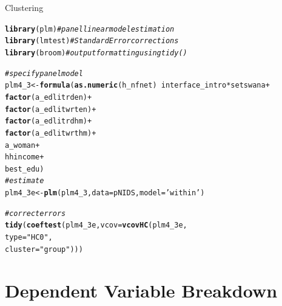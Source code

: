 \documentclass[a4paper,british]{article}\usepackage[]{graphicx}\usepackage[]{xcolor}
\makeatletter
\newcommand{\hlstr}[1]{\textcolor[rgb]{0.192,0.494,0.8}{#1}}%
\newcommand{\hlcom}[1]{\textcolor[rgb]{0.678,0.584,0.686}{\textit{#1}}}%
\newcommand{\hlopt}[1]{\textcolor[rgb]{0,0,0}{#1}}%
\newcommand{\hlstd}[1]{\textcolor[rgb]{0.345,0.345,0.345}{#1}}%
\newcommand{\hlkwb}[1]{\textcolor[rgb]{0.69,0.353,0.396}{#1}}%
\newcommand{\hlkwc}[1]{\textcolor[rgb]{0.333,0.667,0.333}{#1}}%
\newcommand{\hlkwd}[1]{\textcolor[rgb]{0.737,0.353,0.396}{\textbf{#1}}}%
\newenvironment{kframe}{%
 \def\at@end@of@kframe{}%
 \ifinner\ifhmode%
  \def\at@end@of@kframe{\end{minipage}}%
  \begin{minipage}{\columnwidth}%
 \fi\fi%
 \def\FrameCommand##1{\hskip\@totalleftmargin \hskip-\fboxsep
 \colorbox{shadecolor}{##1}\hskip-\fboxsep
     \hskip-\linewidth \hskip-\@totalleftmargin \hskip\columnwidth}%
 \MakeFramed {\advance\hsize-\width
   \@totalleftmargin\z@ \linewidth\hsize
   \@setminipage}}%
 {\par\unskip\endMakeFramed%
 \at@end@of@kframe}
\newenvironment{knitrout}{}{} %
\makeatother
\begin{document}
\begin{table}[H]
\caption{Clustering}

\begin{knitrout}
\color{fgcolor}\begin{kframe}
\begin{alltt}
\hlkwd{library}\hlstd{(plm)}    \hlcom{# panel linear model estimation}
\hlkwd{library}\hlstd{(lmtest)} \hlcom{# Standard Error corrections}
\hlkwd{library}\hlstd{(broom)}  \hlcom{# output formatting using tidy()}

\hlcom{# specify panel model}
\hlstd{plm4_3} \hlkwb{<-} \hlkwd{formula}\hlstd{(}\hlkwd{as.numeric}\hlstd{(h_nfnet)}  \hlopt{~} \hlstd{interface_intro}\hlopt{*}\hlstd{setswana}  \hlopt{+}
                                         \hlkwd{factor}\hlstd{(a_edlitrden)}  \hlopt{+}
                                         \hlkwd{factor}\hlstd{(a_edlitwrten)} \hlopt{+}
                                         \hlkwd{factor}\hlstd{(a_edlitrdhm)}  \hlopt{+}
                                         \hlkwd{factor}\hlstd{(a_edlitwrthm)} \hlopt{+}
                                         \hlstd{a_woman}              \hlopt{+}
                                         \hlstd{hhincome}             \hlopt{+}
                                         \hlstd{best_edu              )}
\hlcom{# estimate}
\hlstd{plm4_3e} \hlkwb{<-} \hlkwd{plm}\hlstd{(plm4_3,} \hlkwc{data}\hlstd{=pNIDS,} \hlkwc{model}\hlstd{=}\hlstr{'within'}\hlstd{)}
\end{alltt}


{\ttfamily\noindent\bfseries\color{errorcolor}{\#\# Error in `.rowNamesDF<-`(x, value = value): duplicate 'row.names' are not allowed}}\begin{alltt}
\hlcom{# correct errors}
\hlkwd{tidy}\hlstd{(} \hlkwd{coeftest}\hlstd{(plm4_3e,} \hlkwc{vcov}\hlstd{=}\hlkwd{vcovHC}\hlstd{(plm4_3e,}
                                    \hlkwc{type}\hlstd{=}\hlstr{"HC0"}\hlstd{,}
                                    \hlkwc{cluster}\hlstd{=}\hlstr{"group"}\hlstd{)) )}
\end{alltt}


{\ttfamily\noindent\bfseries{}}\end{kframe}
\end{knitrout}
\end{table}


\section{Dependent Variable Breakdown}
\end{document}
